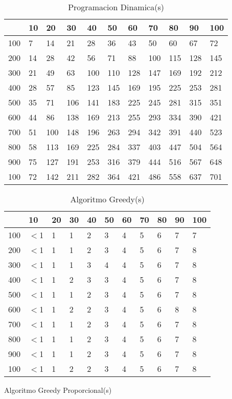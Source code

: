 \documentclass{article}
\begin{document}
\begin{center}
\begin{table}
\centering
\caption{Programacion Dinamica(\textmu s)}
\begin{tabularx}{0.8\textwidth}{|X|X|X|X|X|X|X|X|X|X|X|}
\hline &10&20&30&40&50&60&70&80&90&100\\
\hline 100&7&14&21&28&36&43&50&60&67&72\\
\hline 200&14&28&42&56&71&88&100&115&128&145\\
\hline 300&21&49&63&100&110&128&147&169&192&212\\
\hline 400&28&57&85&123&145&169&195&225&253&281\\
\hline 500&35&71&106&141&183&225&245&281&315&351\\
\hline 600&44&86&138&169&213&255&293&334&390&421\\
\hline 700&51&100&148&196&263&294&342&391&440&523\\
\hline 800&58&113&169&225&284&337&403&447&504&564\\
\hline 900&75&127&191&253&316&379&444&516&567&648\\
\hline 100&72&142&211&282&364&421&486&558&637&701\\
\hline
\end{tabularx}
\end{table}
\begin{table}
\centering
\caption{Algoritmo Greedy(\textmu s)}
\begin{tabularx}{0.8\textwidth}{|X|X|X|X|X|X|X|X|X|X|X|}
\hline &10&20&30&40&50&60&70&80&90&100\\
\hline 100&$<$1&1&1&2&3&4&5&6&7&7\\
\hline 200&$<$1&1&1&2&3&4&5&6&7&8\\
\hline 300&$<$1&1&1&3&4&4&5&6&7&8\\
\hline 400&$<$1&1&2&3&3&4&5&6&7&8\\
\hline 500&$<$1&1&1&2&3&4&5&6&7&8\\
\hline 600&$<$1&1&2&2&3&4&5&6&8&8\\
\hline 700&$<$1&1&1&2&3&4&5&6&7&8\\
\hline 800&$<$1&1&1&2&3&4&5&6&7&8\\
\hline 900&$<$1&1&1&2&3&4&5&6&7&8\\
\hline 100&$<$1&1&2&2&3&4&5&6&7&8\\
\hline
\end{tabularx}
\end{table}
\begin{table}
\centering
\caption{Algoritmo Greedy Proporcional(\textmu s)}

\end{table}
\end{center}
\end{document}
